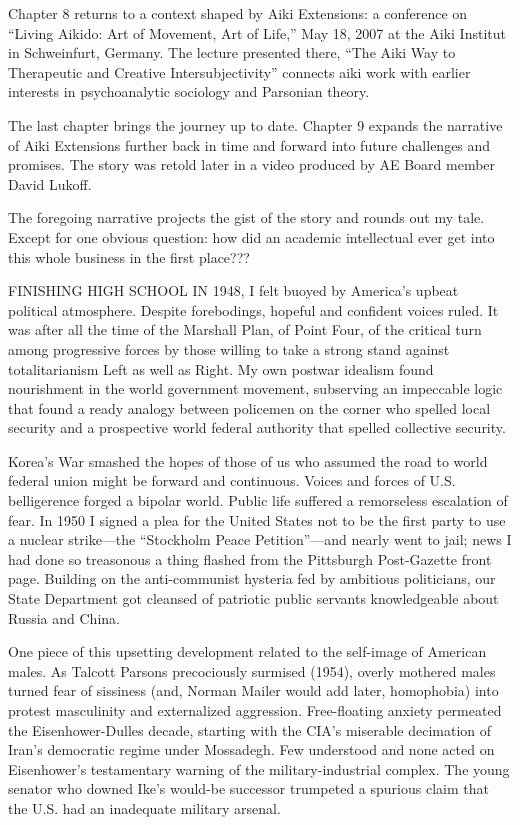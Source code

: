 Chapter 8 returns to a context shaped by Aiki Extensions: a conference on ``Living Aikido: Art of Movement, Art of Life,'' May 18, 2007 at the Aiki Institut in Schweinfurt, Germany. The lecture presented there, ``The Aiki Way to Therapeutic and Creative Intersubjectivity'' connects aiki work with earlier interests in psychoanalytic sociology and Parsonian theory.

The last chapter brings the journey up to date. Chapter 9 expands the narrative of Aiki Extensions further back in time and forward into future challenges and promises. The story was retold later in a video produced by AE Board member David Lukoff.

The foregoing narrative projects the gist of the story and rounds out my tale. Except for one obvious question: how did an academic intellectual ever get into this whole business in the first place???

\vspace{1.5em}

{\uppercase{Finishing high school in 1948}}, I felt buoyed by America's upbeat political atmosphere. Despite forebodings, hopeful and confident voices ruled. It was after all the time of the Marshall Plan, of Point Four, of the critical turn among progressive forces by those willing to take a strong stand against totalitarianism Left as well as Right. My own postwar idealism found nourishment in the world government movement, subserving an impeccable logic that found a ready analogy between policemen on the corner who spelled local security and a prospective world federal authority that spelled collective security. 

Korea's War smashed the hopes of those of us who assumed the road to world federal union might be forward and continuous. Voices and forces of U.S. belligerence forged a bipolar world. Public life suffered a remorseless escalation of fear. In 1950 I signed a plea for the United States not to be the first party to use a nuclear strike---the ``Stockholm Peace Petition''---and nearly went to jail; news I had done so treasonous a thing flashed from the Pittsburgh Post-Gazette front page. Building on the anti-communist hysteria fed by ambitious politicians, our State Department got cleansed of patriotic public servants knowledgeable about Russia and China. 

One piece of this upsetting development related to the self-image of American males. As Talcott Parsons precociously surmised (1954), overly mothered males turned fear of sissiness (and, Norman Mailer would add later, homophobia) into protest masculinity and externalized aggression. Free-floating anxiety permeated the Eisenhower-Dulles decade, starting with the CIA's miserable decimation of Iran's democratic regime under Mossadegh. Few understood and none acted on Eisenhower's testamentary warning of the military-industrial complex. The young senator who downed Ike's would-be successor trumpeted a spurious claim that the U.S. had an inadequate military arsenal.

